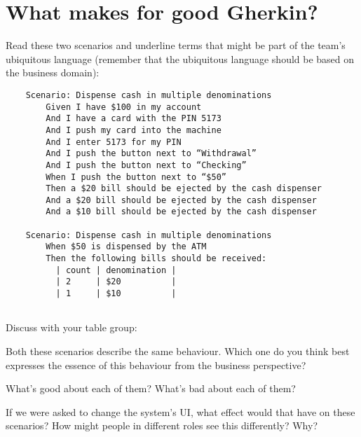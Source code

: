 \chapter*{What makes for good Gherkin?}

Read these two scenarios and underline terms that might be part of the team's ubiquitous language (remember that the ubiquitous language should be based on the business domain):

\begin{verbatim}
    Scenario: Dispense cash in multiple denominations
        Given I have $100 in my account
        And I have a card with the PIN 5173
        And I push my card into the machine
        And I enter 5173 for my PIN
        And I push the button next to “Withdrawal”
        And I push the button next to “Checking”
        When I push the button next to “$50”
        Then a $20 bill should be ejected by the cash dispenser
        And a $20 bill should be ejected by the cash dispenser
        And a $10 bill should be ejected by the cash dispenser
      
    Scenario: Dispense cash in multiple denominations
        When $50 is dispensed by the ATM
        Then the following bills should be received:
          | count | denomination |
          | 2     | $20          |
          | 1     | $10          |
    
\end{verbatim}

Discuss with your table group:

Both these scenarios describe the same behaviour. Which one do you think best expresses the essence of this behaviour from the business perspective?


What's good about each of them? What's bad about each of them?


If we were asked to change the system's UI, what effect would that have on these scenarios?
How might people in different roles see this differently? Why?

